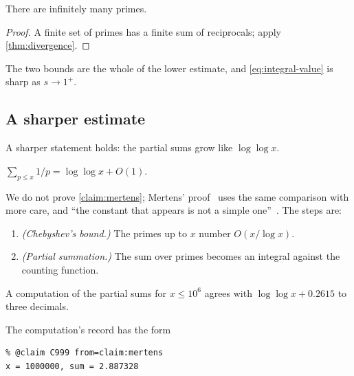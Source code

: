 \begin{cor}\label{cor:infinite}
There are infinitely many primes.
\end{cor}

\begin{proof}
A finite set of primes has a finite sum of reciprocals; apply
\cref{thm:divergence}.
\end{proof}

The two bounds  are the whole of
the lower estimate, and \eqref{eq:integral-value} is sharp as $s \to 1^+$.

\subsection{A sharper estimate}\label{sec:sharper}

A sharper statement holds: the partial sums grow like $\log\log x$.

\begin{claim}\label{claim:mertens}
$\sum_{p \le x} 1/p = \log\log x + O(1)$.
\end{claim}

We do not prove \cref{claim:mertens}; Mertens' proof~\cite{mertens1874}
uses the same comparison with more care, and \enquote{the constant that
appears is not a simple one}~\cite{primer2001}. The steps are:
\begin{enumerate}
  \item \emph{(Chebyshev's bound.)} The primes up to $x$ number $O(x/\log x)$.
  \item \emph{(Partial summation.)} The sum over primes becomes an integral
  against the counting function.
\end{enumerate}

\begin{tcolorbox}
A computation of the partial sums for $x \le 10^6$ agrees with
$\log\log x + 0.2615$ to three decimals.
\end{tcolorbox}

The computation's record has the form
\begin{verbatim}
% @claim C999 from=claim:mertens
x = 1000000, sum = 2.887328
\end{verbatim}

